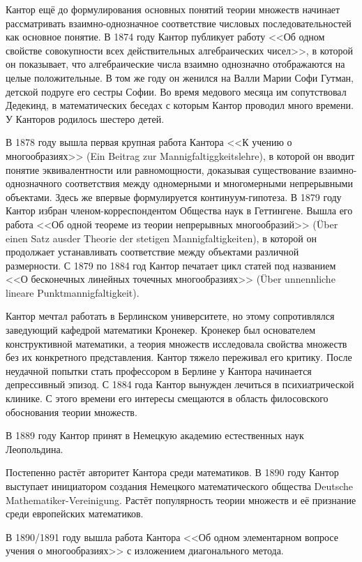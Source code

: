 \documentclass[a4paper,12pt]{extarticle}
\theoremstyle{definition}
\begin{document}
Кантор ещё до формулирования основных понятий теории множеств начинает рассматривать взаимно-однозначное соответствие числовых последовательностей как основное понятие.
В 1874 году Кантор публикует работу <<Об одном свойстве совокупности всех действительных алгебраических чисел>>, в которой он показывает, что алгебраические числа взаимно однозначно отображаются на целые положительные.
В том же году он женился на Валли Марии Софи Гутман, детской подруге его сестры Софии.
Во время медового месяца им сопутствовал Дедекинд, в математических беседах с которым Кантор проводил много времени.
У Канторов родилось шестеро детей.

В 1878 году вышла первая крупная работа Кантора <<К учению о многообразиях>> (Ein Beitrag zur Mannigfaltiggkeitslehre), в которой он вводит понятие эквивалентности или равномощности,
доказывая существование взаимно-однозначного соответствия между одномерными и многомерными непрерывными объектами.
Здесь же впервые формулируется континуум-гипотеза.
В 1879 году Кантор избран членом-корреспондентом Общества наук в Геттингене.
Вышла его работа <<Об одной теореме из теории непрерывных многообразий>> (Über einen Satz ausder Theorie der stetigen Mannigfaltigkeiten),
в которой он продолжает устанавливать соответствие между объектами различной размерности.
С 1879 по 1884 год Кантор печатает цикл статей под названием <<О бесконечных линейных точечных многообразиях>> (Über unnennliche lineare Punktmannigfaltigkeit).

Кантор мечтал работать в Берлинском университете, но этому сопротивлялся заведующий кафедрой математики Кронекер.
Кронекер был основателем конструктивной математики, а теория множеств исследовала свойства множеств без их конкретного представления.
Кантор тяжело переживал его критику.
После неудачной попытки стать профессором в Берлине у Кантора начинается депрессивный эпизод.
С 1884 года Кантор вынужден лечиться в психиатрической клинике.
С этого времени его интересы смещаются в область филосовского обоснования теории множеств.

В 1889 году Кантор принят в Немецкую академию естественных наук Леопольдина.

Постепенно растёт авторитет Кантора среди математиков.
В 1890 году Кантор выступает инициатором создания Немецкого математического общества Deutsche Mathematiker-Vereinigung.
Растёт популярность теории множеств и её признание среди европейских математиков.

В 1890/1891 году вышла работа Кантора <<Об одном элементарном вопросе учения о многообразиях>> с изложением диагонального метода.
\end{document}

